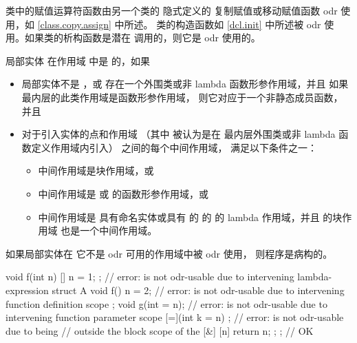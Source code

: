 \pnum
类中的赋值运算符函数由另一个类的
隐式定义的
复制赋值或移动赋值函数 odr 使用，如 \ref{class.copy.assign} 中所述。
类的构造函数如 \ref{dcl.init} 中所述被 odr 使用。如果类的析构函数是潜在
调用的，则它是 odr 使用的。

\pnum
局部实体
在作用域 中是  的，如果
\begin{itemize}
\item 局部实体不是 ，或
存在一个外围类或非 lambda 函数形参作用域，并且
如果最内层的此类作用域是函数形参作用域，
则它对应于一个非静态成员函数，并且
\item
对于引入实体的点和作用域
（其中  被认为是在
最内层外围类或非 lambda 函数定义作用域内引入）
之间的每个中间作用域，
满足以下条件之一：
\begin{itemize}
\item 中间作用域是块作用域，或
\item 中间作用域是
 或  的函数形参作用域，或
\item 中间作用域是
具有命名实体或具有  的  的  的 lambda 作用域，并且
 的块作用域
也是一个中间作用域。
\end{itemize}
\end{itemize}

如果局部实体在
它不是 odr 可用的作用域中被 odr 使用，
则程序是病构的。
\begin{example}
\begin{codeblock}
void f(int n) {
  [] { n = 1; };                // error:  is not odr-usable due to intervening lambda-expression
  struct A {
    void f() { n = 2; }         // error:  is not odr-usable due to intervening function definition scope
  };
  void g(int = n);              // error:  is not odr-usable due to intervening function parameter scope
  [=](int k = n) {};            // error:  is not odr-usable due to being
                                // outside the block scope of the 
  [&] { [n]{ return n; }; };    // OK
}
\end{codeblock}
\end{example}

